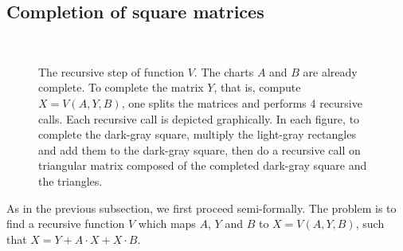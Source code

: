 \documentclass{CSML}
\numberwithin{theorem}{section}
\newcommand{\subc}[3] {
  \draw[thin] (#1,#1) -- (#1,#2) node[inChart] {#3} -- (#2,#2);
 }
\begin{document}
\subsection{Completion of square matrices}\label{sec:completion}
\newcommand{\reccall}[4] {
\fill[black, very nearly transparent] (#1,#1) -- (#1,#4) -- (#4,#4) -- (#3,#3) -- (#2,#3) -- (#2,#2) -- cycle;
\fill[black, very nearly transparent] (#1,#3) -- (#1,#4) -- (#2,#4) -- (#2,#3) -- cycle;
\fill[black, very nearly transparent] (#1,#1) -- (#1,#2) -- (#2,#2) -- cycle;
  \fill[black, very nearly transparent] (#3,#3) -- (#3,#4) -- (#4,#4) -- cycle;
 }
\newcommand{\vpicture}[4]{
    \pgftransformrotate{-90}
    \pgftransformscale{1.1}
    \node at (0,-1) {Step #4:};
    \small
    \draw (0,0) -- (4,4);
    \subc 0 1 {$A_{11}$};
    \subc 1 2 {$A_{22}$};
    \subc 0 2 {$A_{12}$};
    \subc 2 4 {$B_{12}$};
    \subc 2 3 {$B_{11}$};
    \subc 3 4 {$B_{22}$};

    \subc 1 3 {$#1_{21}$};
    \subc 0 3 {$#2_{11}$};
    \subc 1 4 {$#3_{22}$};
    \subc 0 4 {$Y_{12}$};
}
\begin{figure}
  \centering
{}
\\

  \caption{\small The recursive step of function $V$.
The charts $A$ and $B$ are already complete.
To complete the matrix $Y$, that is, compute $X = V(A,Y,B)$, one
    splits the matrices and performs 4 recursive calls.
Each recursive call is depicted graphically.
In each figure, to complete the dark-gray square, multiply the
    light-gray rectangles and add them to the dark-gray square,
    then do a recursive call on triangular matrix composed of
    the completed dark-gray square and the triangles.
}
\label{fig:valiant}
\end{figure}
As in the previous subsection, we first proceed semi-formally.
The problem is to find a recursive function $V$ which maps $A$, $Y$
and $B$ to $X = V(A,Y,B)$, such that $X = Y + A·X + X·B$.
\end{document}
